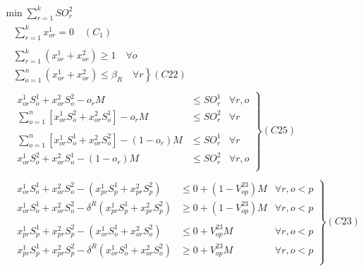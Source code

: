 \documentclass[10pt]{article}
\begin{document}
\begin{displaymath}
    \begin{array}{l}
        \min \sum_{r = 1}^kSO_{r}^2 \\
        \quad \sum_{r = 1}^k x_{or}^1 = 0 \quad (C_1) \\
        \\
        \quad \sum_{r = 1}^k (x_{or}^1 + x_{or}^2) \geq 1 \quad \forall o \\
        \quad \left. \sum_{o = 1}^n (x_{or}^1 + x_{or}^2) \leq \beta_R \quad \forall r \right\} (C22) \\
        \\
        \quad \left.
            \begin{array}{rll}
                x_{or}^1 S_o^1 + x_{or}^2 S_o^2 - o_rM & \leq SO_r^1 & \forall r, o \\
                \sum_{o = 1}^n [ x_{or}^1 S_o^2 + x_{or}^2 S_o^1 ] - o_rM & \leq SO_r^2 & \forall r \\
                \\
                \sum_{o = 1}^n [ x_{or}^1 S_o^1 + x_{or}^2 S_o^2 ] - (1 - o_r)M & \leq SO_r^1 & \forall r \\
                x_{or}^1 S_o^2 + x_{or}^2 S_o^1 - (1 - o_r)M & \leq SO_r^2 & \forall r, o \\
        \end{array} \right\} (C25) \\
        \\
        \quad \left.
            \begin{array}{rll}
                x_{or}^1S_o^1 + x_{or}^2S_o^2 - (x_{pr}^1S_p^1 + x_{pr}^2S_p^2) & \leq 0 + (1 - V_{op}^{23})M & \forall r, o < p \\
                x_{or}^1S_o^1 + x_{or}^2S_o^2 - \delta^R (x_{pr}^1S_p^1 + x_{pr}^2S_p^2) & \geq 0 + (1 - V_{op}^{23})M & \forall r, o < p \\
                \\
                x_{pr}^1S_p^1 + x_{pr}^2S_p^2 -  (x_{or}^1S_o^1 + x_{or}^2S_o^2) & \leq 0 + V_{op}^{23}M & \forall r, o < p \\
                x_{pr}^1S_p^1 + x_{pr}^2S_p^2 - \delta^R (x_{or}^1S_o^1 + x_{or}^2S_o^2) & \geq 0 + V_{op}^{23}M & \forall r, o < p \\
        \end{array} \right\} (C23) \\
        \\
        \quad \left.
            \begin{array}{rll}

\end{array}
\end{array}
\end{displaymath}
\end{document}
